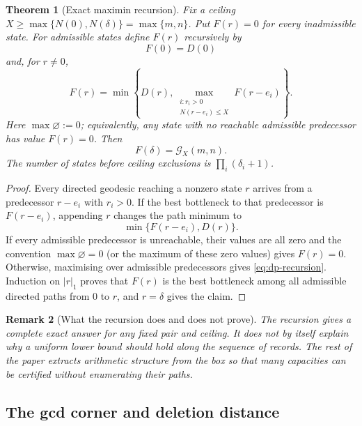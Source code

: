 \documentclass[11pt]{article}
\numberwithin{equation}{section}
\theoremstyle{blueplain}
\newtheorem{theorem}{Theorem}[section]
\theoremstyle{bluedef}
\newtheorem{remark}[theorem]{Remark}
\newcommand{\N}{\mathbb N}
\newcommand{\Gcal}{\mathcal G}
\begin{document}
\begin{theorem}[Exact maximin recursion]
\label{thm:dp}
 Fix a ceiling $X\ge\max\{N(0),N(\delta)\}=\max\{m,n\}$.  Put $F(r)=0$ for every inadmissible state.  For admissible states define $F(r)$ recursively by
\begin{equation}
 F(0)=D(0)
 \label{eq:dp-initial}
\end{equation}
and, for $r\ne0$,
\begin{equation}
 \boxed{
 F(r)=\min\left\{D(r),
 \max_{\substack{i:r_i>0\\N(r-e_i)\le X}}F(r-e_i)
 \right\}.}
 \label{eq:dp-recursion}
\end{equation}
 Here $\max\varnothing:=0$; equivalently, any state with no reachable admissible predecessor has value $F(r)=0$.  Then
\begin{equation}
 F(\delta)=\Gcal_X(m,n).
 \label{eq:dp-exact}
\end{equation}
The number of states before ceiling exclusions is $\prod_i(\delta_i+1)$.
\end{theorem}

\begin{proof}
Every directed geodesic reaching a nonzero state $r$ arrives from a predecessor $r-e_i$ with $r_i>0$.  If the best bottleneck to that predecessor is $F(r-e_i)$, appending $r$ changes the path minimum to
\[
 \min\{F(r-e_i),D(r)\}.
\]
If every admissible predecessor is unreachable, their values are all zero and the convention $\max\varnothing=0$ (or the maximum of these zero values) gives $F(r)=0$.  Otherwise, maximising over admissible predecessors gives \eqref{eq:dp-recursion}.  Induction on $|r|_1$ proves that $F(r)$ is the best bottleneck among all admissible directed paths from $0$ to $r$, and $r=\delta$ gives the claim.
\end{proof}

\begin{remark}[What the recursion does and does not prove]
The recursion gives a complete exact answer for any fixed pair and ceiling.  It does not by itself explain why a uniform lower bound should hold along the sequence of records.  The rest of the paper extracts arithmetic structure from the box so that many capacities can be certified without enumerating their paths.
\end{remark}

\subsection{The gcd corner and deletion distance}
\end{document}
